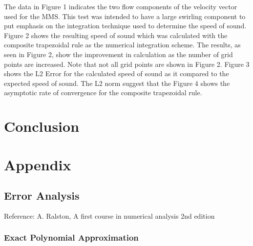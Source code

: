 \documentclass[12pt]{article}
\begin{document}
\begin{figure}
    \begin{center}
        
    \end{center}
\end{figure}

\begin{figure}
    \begin{center}
        
    \end{center}
\end{figure}
The data in Figure 1 indicates the two flow components of the velocity vector 
used for the MMS. This test was intended to have a large swirling component to
put emphasis on the integration technique used to determine the speed of sound.
Figure 2 shows the resulting speed of sound which was calculated
with the composite trapezoidal rule as the numerical integration scheme. The 
results, as seen in Figure 2, show the improvement in calculation as the number 
of grid points are increased. Note that not all grid points are shown in Figure 2. 
Figure 3 shows the L2 Error for the calculated speed of sound as it compared to the 
expected speed of sound. The L2 norm suggest that the  Figure 4 shows the asymptotic rate of convergence for
the composite trapezoidal rule.





\section{Conclusion}
\section{Appendix}

\subsection{Error Analysis}


Reference: A. Ralston, A first course in numerical analysis 2nd edition

\subsubsection{Exact Polynomial Approximation}
\end{document}
